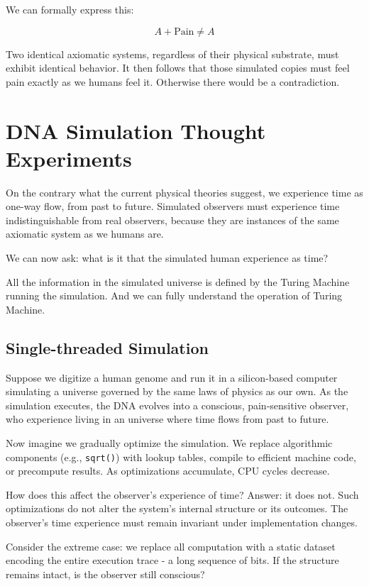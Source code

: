 \documentclass[11pt]{article}
\begin{document}
We can formally express this:

\begin{equation}
  A + \text{Pain} \neq A
\end{equation}

Two identical axiomatic systems, regardless of their physical substrate, must exhibit identical behavior. It then follows that those simulated copies must feel pain exactly as we humans feel it.
Otherwise there would be a contradiction.



\section{DNA Simulation Thought Experiments}

On the contrary what the current physical theories suggest, we experience time as one-way flow, from past to future.
Simulated observers must experience time indistinguishable from real observers, because they are instances of the same
axiomatic system as we humans are.

We can now ask: what is it that the simulated human experience as time?

All the information in the simulated universe is defined by the Turing Machine running the simulation. And we can fully understand the operation of Turing Machine.


\subsection{Single-threaded Simulation}

Suppose we digitize a human genome and run it in a silicon-based computer simulating a universe governed by the same laws of physics as our own.
As the simulation executes, the DNA evolves into a conscious, pain-sensitive observer, who experience living in an universe where time flows from past to future.

Now imagine we gradually optimize the simulation. We replace algorithmic components (e.g., \texttt{sqrt()}) with lookup tables, compile to efficient machine
code, or precompute results. As optimizations accumulate, CPU cycles decrease.

How does this affect the observer's experience of time? Answer: it does not. Such optimizations do not alter the system's internal structure
or its outcomes. The observer’s time experience must remain invariant under implementation changes.

Consider the extreme case: we replace all computation with a static dataset encoding the entire execution trace - a long sequence of bits.
If the structure remains intact, is the observer still conscious?
\end{document}
